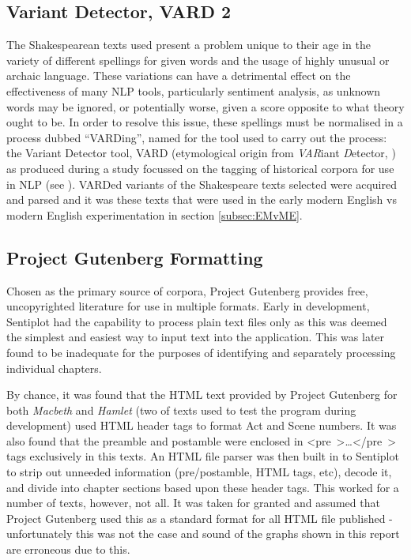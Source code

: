\documentclass{article}
\begin{document}
{    \subsection{Variant Detector, VARD 2}
    \label{subsec:vard}
        The Shakespearean texts used present a problem unique to their age in the variety of different spellings for given words and the usage of highly unusual or archaic language. These variations can have a detrimental effect on the effectiveness of many NLP tools, particularly sentiment analysis, as unknown words may be ignored, or potentially worse, given a score opposite to what theory ought to be. In order to resolve this issue, these spellings must be normalised in a process dubbed ``VARDing'', named for the tool used to carry out the process: the Variant Detector tool, VARD (etymological origin from \textit{VAR}iant \textit{D}etector, \cite{baron2008vard2}) as produced during a study focussed on the tagging of historical corpora for use in NLP (see \cite{rayson2007tagging}). VARDed variants of the Shakespeare texts selected were acquired and parsed and it was these texts that were used in the early modern English vs modern English experimentation in section \ref{subsec:EMvME}.
    \subsection{Project Gutenberg Formatting}
    \label{subsec:gutenbergFormat}
            Chosen as the primary source of corpora, Project Gutenberg provides free, uncopyrighted literature for use in multiple formats. Early in development, Sentiplot had the capability to process plain text files only as this was deemed the simplest and easiest way to input text into the application. This was later found to be inadequate for the purposes of identifying and separately processing individual chapters.

            By chance, it was found that the HTML text provided by Project Gutenberg for both \textit{Macbeth} and \textit{Hamlet} (two of texts used to test the program during development) used HTML header tags to format Act and Scene numbers. It was also found that the preamble and postamble were enclosed in \mbox{\textless pre \textgreater \dots \textless /pre \textgreater} tags exclusively in this texts. An HTML file parser was then built in to Sentiplot to strip out unneeded information (pre/postamble, HTML tags, etc), decode it, and divide into chapter sections based upon these header tags. This worked for a number of texts, however, not all. It was taken for granted and assumed that Project Gutenberg used this as a standard format for all HTML file published - unfortunately this was not the case and sound of the graphs shown in this report are erroneous due to this.
            
}
\end{document}
